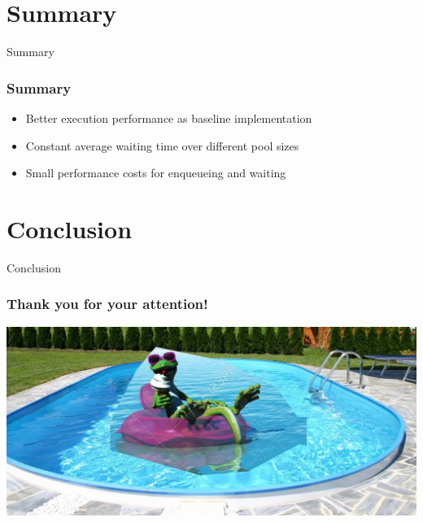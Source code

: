 \documentclass{beamer}
\begin{document}
\section{Summary}
\begin{frame}
	\begin{center}
		\huge Summary
	\end{center}
\end{frame}

\begin{frame}
	\frametitle{Summary}
	\begin{itemize}
		\item Better execution performance as baseline implementation
		\item Constant average waiting time over different pool sizes
		\item Small performance costs for enqueueing and waiting
	\end{itemize}
\end{frame}

\section{Conclusion}
	\begin{frame}
	\begin{center}
		\huge Conclusion
	\end{center}
\end{frame}



\begin{frame}
    \frametitle{Thank you for your attention!}
 	\includegraphics[width=\textwidth]{img/important.jpg}
\end{frame}
\end{document}
